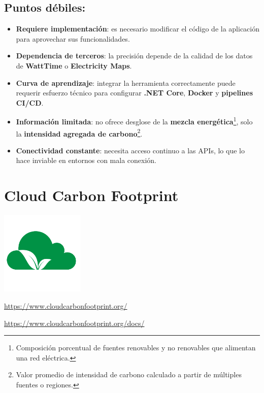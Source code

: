 \documentclass[12pt,a4paper]{report}
\begin{document}
\subsection*{Puntos débiles:}

\begin{itemize}
  \item \textbf{Requiere implementación}: es necesario modificar el código de la aplicación para aprovechar sus funcionalidades.
  \item \textbf{Dependencia de terceros}: la precisión depende de la calidad de los datos de \textbf{WattTime} o \textbf{Electricity Maps}.
  \item \textbf{Curva de aprendizaje}: integrar la herramienta correctamente puede requerir esfuerzo técnico para configurar \textbf{.NET Core}, \textbf{Docker} y \textbf{pipelines CI/CD}.
  \item \textbf{Información limitada}: no ofrece desglose de la \textbf{mezcla energética}\footnote{Composición porcentual de fuentes renovables y no renovables que alimentan una red eléctrica.}, solo la \textbf{intensidad agregada de carbono}\footnote{Valor promedio de intensidad de carbono calculado a partir de múltiples fuentes o regiones.}.
  \item \textbf{Conectividad constante}: necesita acceso continuo a las APIs, lo que lo hace inviable en entornos con mala conexión.
\end{itemize}

\section*{Cloud Carbon Footprint}

\begin{center}
\includegraphics[width=0.3\textwidth]{imagenes/Cloud_Logo.png}
\end{center}

\href{https://www.cloudcarbonfootprint.org/}{https://www.cloudcarbonfootprint.org/}

\href{https://www.cloudcarbonfootprint.org/docs/}{https://www.cloudcarbonfootprint.org/docs/}
\end{document}
